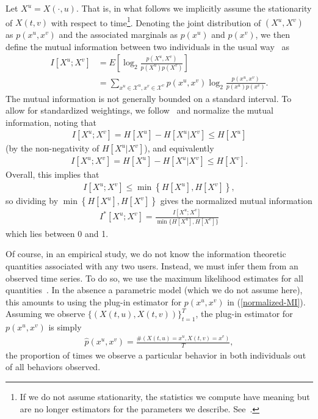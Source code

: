 \documentclass[12pt]{article}
\begin{document}
Let $X^{u} = X(\cdot, u).$ That is, in what follows we implicitly assume the stationarity of $X(t, v)$ with respect to time\footnote{If we do not assume stationarity, the statistics we compute have meaning but are no longer estimators for the parameters we describe. See~\cite{vu2009information}.}. Denoting the joint distribution of $(X^{u}, X^{v})$ as $p(x^{u}, x^{v})$ and the associated marginals as $p(x^{u})$ and $p(x^{v})$, we then define the mutual information between two individuals in the usual way~\cite{cover2012elements} as
\begin{align}
	I[X^{u}; X^{v}] &= E\left[\log_{2} \frac{p(X^{u}, X^{v})}{p(X^{u})p(X^{v})}\right]\\
	&= \sum_{x^{u} \in \mathcal{X}^{u}, x^{v} \in \mathcal{X}^{v}} p(x^{u}, x^{v}) \log_{2} \frac{p(x^{u}, x^{v})}{p(x^{u}) p(x^{v})}.
\end{align}
The mutual information is not generally bounded on a standard interval. To allow for standardized weightings, we follow~\cite{shalizi2007discovering} and normalize the mutual information, noting that
\begin{align}
	I[X^{u}; X^{v}] = H[X^{u}] - H[X^{u} | X^{v}] \leq H[X^{u}]
\end{align}
(by the non-negativity of $H[X^{u} | X^{v}]$), and equivalently
\begin{align}
	I[X^{u}; X^{v}] = H[X^{u}] - H[X^{u} | X^{v}] \leq H[X^{v}].
\end{align}
Overall, this implies that
\begin{align}
	I[X^{u}; X^{v}] \leq \min \left\{ H[X^{u}], H[X^{v}]\right\},
\end{align}
so dividing by $\min \left\{ H[X^{u}], H[X^{v}]\right\}$ gives the normalized mutual information
\begin{align}
	I^{*}[X^{u}; X^{v}] = \frac{I[X^{u}; X^{v}]}{\min \{ H[X^{u}], H[X^{v}]\}} \label{normalized-MI}
\end{align}
which lies between 0 and 1.

Of course, in an empirical study, we do not know the information theoretic quantities associated with any two users. Instead, we must infer them from an observed time series. To do so, we use the maximum likelihood estimates for all quantities~\cite{paninski2003estimation}. In the absence a parametric model (which we do not assume here), this amounts to using the plug-in estimator for $p(x^{u}, x^{v})$ in (\ref{normalized-MI}). Assuming we observe $\{ (X(t, u), X(t, v)) \}_{t = 1}^{T}$, the plug-in estimator for $p(x^{u}, x^{v})$ is simply
\begin{align}
	\hat{p}(x^{u}, x^{v}) = \frac{\#(X(t, u) = x^{u}, X(t, v) = x^{v})}{T},
\end{align}
the proportion of times we observe a particular behavior in both individuals out of all behaviors observed.
\end{document}
